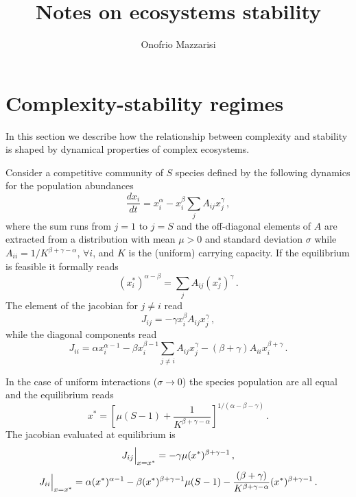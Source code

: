 \documentclass[10pt]{article}
\title{{\bf Notes on ecosystems stability}}
\author{Onofrio Mazzarisi}
\begin{document}


\maketitle

\section{Complexity-stability regimes}
\label{sec: complexity-stability regimes}
In this section we describe how the relationship between complexity and stability
is shaped by dynamical properties of complex ecosystems.

Consider a competitive community of $S$ species
defined by the following dynamics for the population abundances
\begin{equation}
    \frac{dx_i}{dt}=x_i^{\alpha}-x_i^{\beta}\sum_{j}A_{ij}x_j^{\gamma} \, ,
\end{equation}
where the sum runs from $j=1$ to $j=S$ and the off-diagonal elements
of $A$ are extracted from a distribution
with mean $\mu>0$ and standard deviation $\sigma$ while $A_{ii}=1/K^{\beta+\gamma-\alpha}$, $\forall i$,
and $K$ is the (uniform) carrying capacity.
If the equilibrium is feasible it formally reads
\begin{equation}
    (x_i^*)^{\alpha-\beta} = \sum_{j}A_{ij}(x_j^*)^{\gamma} \, .
\end{equation}
The element of the jacobian for $j\neq i$ read
\begin{equation}
    J_{ij} = -\gamma x_i^{\beta}A_{ij}x_j^{\gamma} \, ,
\end{equation}
while the diagonal components read
\begin{equation}
    J_{ii} = \alpha x_i^{\alpha-1}-\beta x_i^{\beta-1}\sum_{j\neq i}A_{ij}x_j^{\gamma}
    - (\beta+\gamma)A_{ii}x_i^{\beta+\gamma} \, .
\end{equation}

In the case of uniform interactions ($\sigma\to0$)
the species population are all equal and the equilibrium reads
\begin{equation}
    x^*=\left[\mu(S-1)+\frac{1}{K^{\beta+\gamma-\alpha}}\right]^{1/(\alpha-\beta-\gamma)} \, .
\end{equation}
The jacobian evaluated at equilibrium is
\begin{equation}
    J_{ij}\Big{|}_{x=x^*} = -\gamma \mu (x^*)^{\beta+\gamma-1} \, ,
\end{equation}
\begin{equation}
    J_{ii}\Big{|}_{x=x^*} = \alpha (x^*)^{\alpha-1}-\beta (x^*)^{\beta+\gamma-1}\mu(S-1)
                            -\frac{(\beta+\gamma)}{K^{\beta+\gamma-\alpha}}(x^*)^{\beta+\gamma-1}\, .
\end{equation}
\end{document}

